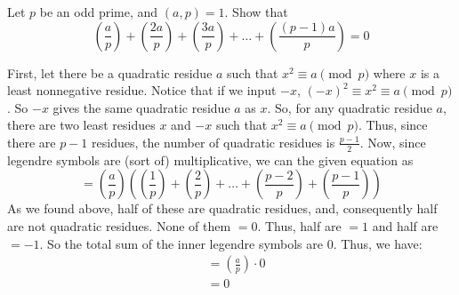 \documentclass{article}
\newcommand{\legendre}[2]{\left(\frac{#1}{#2}\right)}
\begin{document}
\begin{problem}{}{}
    Let $p$ be an odd prime, and $(a,p)=1$. Show that
    \[\left(\frac{a}{p}\right)+\left(\frac{2a}{p}\right)+\left(\frac{3a}{p}\right)+\dots+\left(\frac{(p-1)a}{p}\right)=0\]
\end{problem}
\begin{solution}{}{}
    First, let there be a quadratic residue $a$ such that $x^2\equiv a\pmod{p}$ where $x$ is a least nonnegative residue. Notice that if we input $-x$, $(-x)^2\equiv x^2\equiv a\pmod{p}$. So $-x$ gives the same quadratic residue $a$ as $x$. So, for any quadratic residue $a$, there are two least residues $x$ and $-x$ such that $x^2\equiv a\pmod{p}$. Thus, since there are $p-1$ residues, the number of quadratic residues is $\frac{p-1}{2}$. Now, since legendre symbols are (sort of) multiplicative, we can the given equation as 
    \[=\legendre{a}{p}\left(\legendre{1}{p}+\legendre{2}{p}+\dots+\legendre{p-2}{p}+\legendre{p-1}{p}\right)\]
    As we found above, half of these are quadratic residues, and, consequently half are not quadratic residues. None of them $=0$. Thus, half are $=1$ and half are $=-1$. So the total sum of the inner legendre symbols are $0$. Thus, we have:
    \begin{align*}
        &=\legendre{a}{p}\cdot0\\
        &=0
    \end{align*}
\end{solution}
\end{document}
